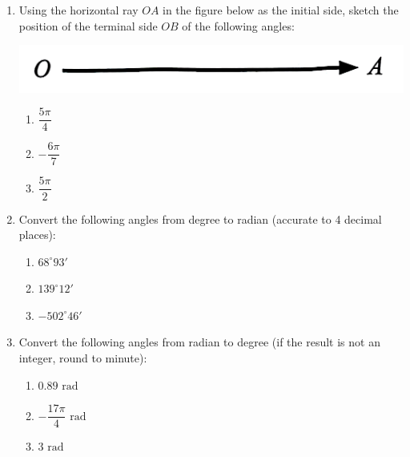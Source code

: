 \documentclass{report}
\begin{document}
\begin{enumerate}
	\item Using the horizontal ray $OA$ in the figure below as the initial side, sketch the position of the terminal side $OB$ of the following angles:
	      \begin{center}
	      	\includegraphics[scale=0.15]{assets/8-4.png}
	      \end{center}
	      \vspace{-1em}
	      \begin{multicols}{3}
	      	\begin{enumerate}[label=(\alph*)]
	      		\item $\dfrac{5 \pi}{4}$
	      		\item $-\dfrac{6 \pi}{7}$
	      		\item $\dfrac{5 \pi}{2}$
	      	\end{enumerate}
	      \end{multicols}
	          
	\item Convert the following angles from degree to radian (accurate to 4 decimal places):
	      \vspace{-1em}
	      \begin{multicols}{3}
	      	\begin{enumerate}[label=(\alph*)]
	      		\item $68^\circ 93'$
	      		\item $139^\circ 12'$
	      		\item $-502^\circ 46'$
	      	\end{enumerate}
	      \end{multicols}
	      
	\item Convert the following angles from radian to degree (if the result is not an integer, round to minute):
	      \vspace{-1em}
	      \begin{multicols}{3}
	      	\begin{enumerate}[label=(\alph*)]
	      		\item $0.89 \text{ rad}$
	      		\item $-\dfrac{17\pi}{4} \text{ rad}$
	      		\item $3 \text{ rad}$
	      	\end{enumerate}
	      \end{multicols}
	      

\end{enumerate}
\end{document}
